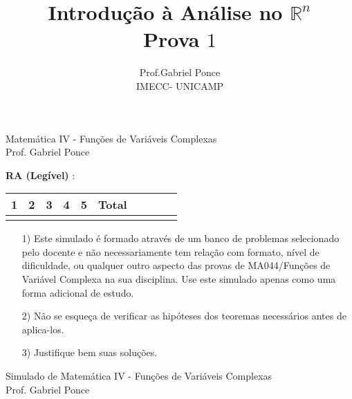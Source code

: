 \documentclass[12pt,reqno]{article}
\title{Introdu\c c\~ao \`a An\'alise no $\mathbb R^n$ \\ Prova $1$}
\author{Prof.Gabriel Ponce \\ {\small IMECC- UNICAMP} }
\date{}
\numberwithin{equation}{section}
\begin{document}
\begin{center}
{\Large Matem\'atica IV  - Fun\c c\~oes de Vari\'aveis Complexas} \\
\vspace{.2cm}
{Prof. Gabriel Ponce}
\end{center}

\noindent  \textbf{RA (Leg\'ivel)} : 
\quad 
\vspace{.5cm}

\begin{center}
\vspace{0.5cm}
\begin{tabular}{r|r|r|r|r|r|r|r|r|r}
 
1 & 2 & 3 & 4 & 5 & Total \\ %
\hline                               %
 \quad  \quad &\quad  \quad &\quad  \quad&\quad  \quad&\quad  \quad &\quad  \quad 
\end{tabular}
\end{center}

\begin{itemize}
\item[1)] Este simulado \'e formado atrav\'es de um banco de problemas selecionado pelo docente e n\~ao necessariamente tem rela\c c\~ao com formato, n\'ivel de dificuldade, ou qualquer outro aspecto das provas de MA044/Fun\c c\~oes de Vari\'avel Complexa na sua disciplina. Use este simulado apenas como uma forma adicional de estudo.
\item[2)] N\~ao se esque\c ca de verificar as hip\'oteses dos teoremas necess\'arios antes de aplica-los.
\item[3)] Justifique bem suas solu\c c\~oes.
\end{itemize}



\newpage

\begin{center}
{\Large Simulado de Matem\'atica IV  - Fun\c c\~oes de Vari\'aveis Complexas} \\
\vspace{.2cm}
{Prof. Gabriel Ponce}
\end{center}

\vspace{1cm}
\end{document}
